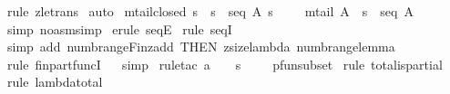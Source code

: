 \begin{isabellebody}
%
\isadelimproof
%
\endisadelimproof
%
\isatagproof
{}\isamarkupfalse%
\ {\isacharparenleft}rule\ zle{\isacharunderscore}trans{\isacharparenright}\isanewline
{}\isamarkupfalse%
\ auto\isanewline
{}\isamarkupfalse%
%
\endisatagproof
{\isafoldproof}%
%
\isadelimproof
\isanewline
%
\endisadelimproof
\isanewline
\isanewline
{}\isamarkupfalse%
\ mtail{\isacharunderscore}closed{\isacharcolon}\ {\isachardoublequoteopen}{\isacharbang}{\isacharbang}s{\isachardot}\ {\isacharbrackleft}{\isacharbar}\ s\ {\isacharcolon}\ seq\ A{\isacharsemicolon}\ s\ {\isachartilde}{\isacharequal}\ {\isacharpercent}{\isacharless}{\isacharpercent}{\isachargreater}\ {\isacharbar}{\isacharbrackright}\ {\isacharequal}{\isacharequal}{\isachargreater}\ mtail\ A\ {\isacharpercent}{\isacharcircum}\ s\ {\isacharcolon}\ seq\ A{\isachardoublequoteclose}\isanewline
%
\isadelimproof
%
\endisadelimproof
%
\isatagproof
{}\isamarkupfalse%
\ {\isacharparenleft}simp\ {\isacharparenleft}no{\isacharunderscore}asm{\isacharunderscore}simp{\isacharparenright}{\isacharparenright}\isanewline
{}\isamarkupfalse%
\ {\isacharparenleft}erule\ seqE{\isacharparenright}\isanewline
{}\isamarkupfalse%
\ {\isacharparenleft}rule\ seqI{\isacharparenright}\isanewline
{}\isamarkupfalse%
\ {}\isanewline
{}\isamarkupfalse%
\ {\isacharparenleft}simp\ add{\isacharcolon}\ numb{\isacharunderscore}range{\isacharunderscore}Fin{\isacharunderscore}zadd\ {\isacharbrackleft}THEN\ zsize{\isacharunderscore}lambda{\isacharbrackright}\ numb{\isacharunderscore}range{\isacharunderscore}lemma{\isacharparenright}\isanewline
{}\isamarkupfalse%
\ {\isacharparenleft}rule\ fin{\isacharunderscore}part{\isacharunderscore}funcI{\isacharparenright}\isanewline
{}\isamarkupfalse%
\ {}\isanewline
{}\isamarkupfalse%
\ simp\isanewline
{}\isamarkupfalse%
\ {\isacharparenleft}rule{\isacharunderscore}tac\ a\ {\isacharequal}\ {\isachardoublequoteopen}{}\ {\isachardot}{\isachardot}\ {\isacharparenleft}{\isacharhash}s\ {\isacharminus}\ {}{\isacharparenright}\ {\isachardoublequoteclose}\ \ pfun{\isacharunderscore}subset{\isacharparenright}\isanewline
{}\isamarkupfalse%
\ {\isacharparenleft}rule\ total{\isacharunderscore}is{\isacharunderscore}partial{\isacharparenright}\isanewline
{}\isamarkupfalse%
\ {\isacharparenleft}rule\ lambda{\isacharunderscore}total{}{\isacharparenright}\isanewline

\end{isabellebody}
